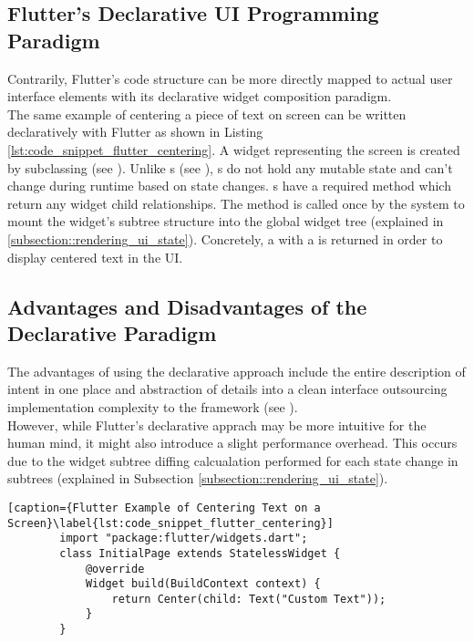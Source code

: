 \subsection{Flutter's Declarative UI Programming Paradigm}
Contrarily, Flutter's code structure can be more directly mapped to actual user interface elements with its declarative widget composition paradigm.\\
The same example of centering a piece of text on screen can be written declaratively with Flutter as shown in Listing \ref{lst:code_snippet_flutter_centering}.
A widget representing the screen is created by subclassing  (see \cite{StatelessWidgetDocumentation2021}). 
Unlike s (see \cite{StatefulWidgetDocumentation2021}), s do not hold any mutable state and can't change during runtime based on state changes. 
s have a required  method which return any widget child relationships. The method is called 
once by the system to mount the widget's subtree structure into the global widget tree (explained in \ref{subsection::rendering_ui_state}).
Concretely, a  with a  is returned in order to display centered text in the UI.\\

\subsection{Advantages and Disadvantages of the Declarative Paradigm}
The advantages of using the declarative approach include the entire description of intent in one place and abstraction of details into
a clean interface outsourcing implementation complexity to the framework (see \cite{FlutterDeclarative2021}).\\
However, while Flutter's declarative apprach may be more intuitive for the human mind, it might also introduce a slight performance overhead.
This occurs due to the widget subtree diffing calcualation performed for each state change in  subtrees (explained in Subsection \ref{subsection::rendering_ui_state}).\\

\begin{minipage}{\linewidth}
    \begin{lstlisting}[caption={Flutter Example of Centering Text on a Screen}\label{lst:code_snippet_flutter_centering}]
        import "package:flutter/widgets.dart";
        class InitialPage extends StatelessWidget {
            @override
            Widget build(BuildContext context) {
                return Center(child: Text("Custom Text"));
            }
        }
    \end{lstlisting}
\end{minipage}

